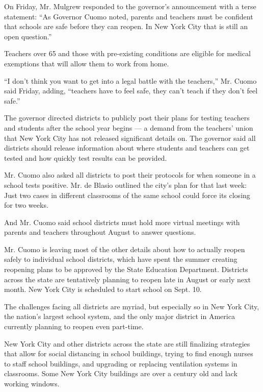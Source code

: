 On Friday, Mr. Mulgrew responded to the governor's announcement with a
terse statement: ``As Governor Cuomo noted, parents and teachers must be
confident that schools are safe before they can reopen. In New York City
that is still an open question.''

Teachers over 65 and those with pre-existing conditions are eligible for
medical exemptions that will allow them to work from home.

``I don't think you want to get into a legal battle with the teachers,''
Mr. Cuomo said Friday, adding, ``teachers have to feel safe, they can't
teach if they don't feel safe.''

The governor directed districts to publicly post their plans for testing
teachers and students after the school year begins --- a demand from the
teachers' union that New York City has not released significant details
on. The governor said all districts should release information about
where students and teachers can get tested and how quickly test results
can be provided.

Mr. Cuomo also asked all districts to post their protocols for when
someone in a school tests positive. Mr. de Blasio outlined the city's
plan for that last week: Just two cases in different classrooms of the
same school could force its closing for two weeks.

And Mr. Cuomo said school districts must hold more virtual meetings with
parents and teachers throughout August to answer questions.

Mr. Cuomo is leaving most of the other details about how to actually
reopen safely to individual school districts, which have spent the
summer creating reopening plans to be approved by the State Education
Department. Districts across the state are tentatively planning to
reopen late in August or early next month. New York City is scheduled to
start school on Sept. 10.

The challenges facing all districts are myriad, but especially so in New
York City, the nation's largest school system, and the only major
district in America currently planning to reopen even part-time.

New York City and other districts across the state are still finalizing
strategies that allow for social distancing in school buildings, trying
to find enough nurses to staff school buildings, and upgrading or
replacing ventilation systems in classrooms. Some New York City
buildings are over a century old and lack working windows.

